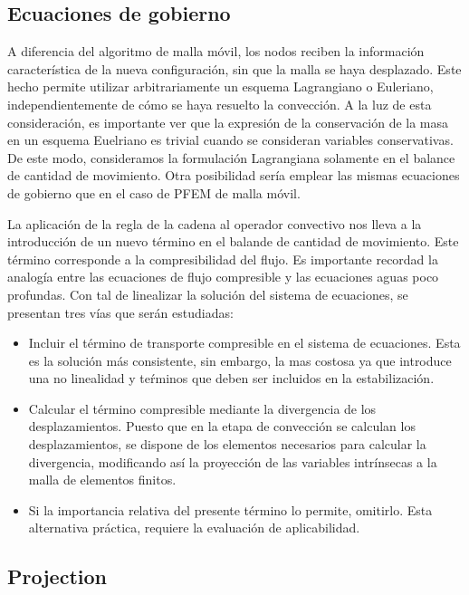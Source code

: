 \subsection{Ecuaciones de gobierno}

A diferencia del algoritmo de malla móvil, los nodos reciben la información característica de la nueva configuración, sin que la malla se haya desplazado. Este hecho permite utilizar arbitrariamente un esquema Lagrangiano o Euleriano, independientemente de cómo se haya resuelto la convección. A la luz de esta consideración, es importante ver que la expresión de la conservación de la masa en un esquema Euelriano es trivial cuando se consideran variables conservativas. De este modo, consideramos la formulación Lagrangiana solamente en el balance de cantidad de movimiento. Otra posibilidad sería emplear las mismas ecuaciones de gobierno que en el caso de PFEM de malla móvil.

La aplicación de la regla de la cadena al operador convectivo nos lleva a la introducción de un nuevo término en el balande de cantidad de movimiento. Este término corresponde a la compresibilidad del flujo. Es importante recordad la analogía entre las ecuaciones de flujo compresible y las ecuaciones aguas poco profundas. Con tal de linealizar la solución del sistema de ecuaciones, se presentan tres vías que serán estudiadas:
\begin{itemize}
    \item Incluir el término de transporte compresible en el sistema de ecuaciones. Esta es la solución más consistente, sin embargo, la mas costosa ya que introduce una no linealidad y teŕminos que deben ser incluidos en la estabilización.
    \item Calcular el término compresible mediante la divergencia de los desplazamientos. Puesto que en la etapa de convección se calculan los desplazamientos, se dispone de los elementos necesarios para calcular la divergencia, modificando así la proyección de las variables intrínsecas a la malla de elementos finitos.
    \item Si la importancia relativa del presente término lo permite, omitirlo. Esta alternativa práctica, requiere la evaluación de aplicabilidad.
\end{itemize}


\subsection{Projection}

